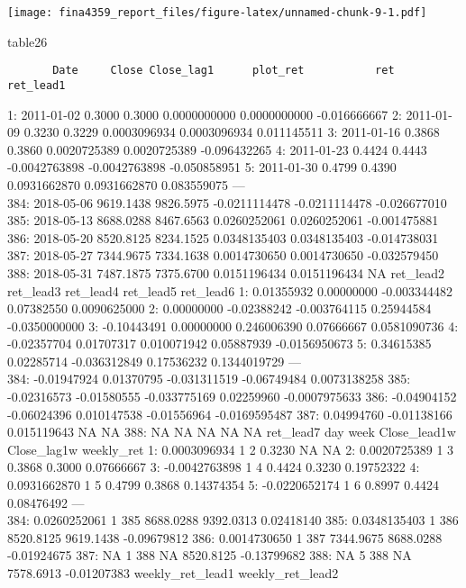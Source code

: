 \documentclass[
]{article}
\newenvironment{Shaded}{\begin{snugshade}}{\end{snugshade}}
\newcommand{\NormalTok}[1]{#1}
\begin{document}
\texttt{[image: fina4359\_report\_files/figure-latex/unnamed-chunk-9-1.pdf]}

\begin{Shaded}
\begin{Highlighting}[]
\NormalTok{table26}
\end{Highlighting}
\end{Shaded}

\begin{verbatim}
       Date     Close Close_lag1      plot_ret           ret    ret_lead1
\end{verbatim}

1: 2011-01-02 0.3000 0.3000 0.0000000000 0.0000000000 -0.016666667 2:
2011-01-09 0.3230 0.3229 0.0003096934 0.0003096934 0.011145511 3:
2011-01-16 0.3868 0.3860 0.0020725389 0.0020725389 -0.096432265 4:
2011-01-23 0.4424 0.4443 -0.0042763898 -0.0042763898 -0.050858951 5:
2011-01-30 0.4799 0.4390 0.0931662870 0.0931662870 0.083559075 ---\\
384: 2018-05-06 9619.1438 9826.5975 -0.0211114478 -0.0211114478
-0.026677010 385: 2018-05-13 8688.0288 8467.6563 0.0260252061
0.0260252061 -0.001475881 386: 2018-05-20 8520.8125 8234.1525
0.0348135403 0.0348135403 -0.014738031 387: 2018-05-27 7344.9675
7334.1638 0.0014730650 0.0014730650 -0.032579450 388: 2018-05-31
7487.1875 7375.6700 0.0151196434 0.0151196434 NA ret\_lead2 ret\_lead3
ret\_lead4 ret\_lead5 ret\_lead6 1: 0.01355932 0.00000000 -0.003344482
0.07382550 0.0090625000 2: 0.00000000 -0.02388242 -0.003764115
0.25944584 -0.0350000000 3: -0.10443491 0.00000000 0.246006390
0.07666667 0.0581090736 4: -0.02357704 0.01707317 0.010071942 0.05887939
-0.0156950673 5: 0.34615385 0.02285714 -0.036312849 0.17536232
0.1344019729 ---\\
384: -0.01947924 0.01370795 -0.031311519 -0.06749484 0.0073138258 385:
-0.02316573 -0.01580555 -0.033775169 0.02259960 -0.0007975633 386:
-0.04904152 -0.06024396 0.010147538 -0.01556964 -0.0169595487 387:
0.04994760 -0.01138166 0.015119643 NA NA 388: NA NA NA NA NA ret\_lead7
day week Close\_lead1w Close\_lag1w weekly\_ret 1: 0.0003096934 1 2
0.3230 NA NA 2: 0.0020725389 1 3 0.3868 0.3000 0.07666667 3:
-0.0042763898 1 4 0.4424 0.3230 0.19752322 4: 0.0931662870 1 5 0.4799
0.3868 0.14374354 5: -0.0220652174 1 6 0.8997 0.4424 0.08476492 ---\\
384: 0.0260252061 1 385 8688.0288 9392.0313 0.02418140 385: 0.0348135403
1 386 8520.8125 9619.1438 -0.09679812 386: 0.0014730650 1 387 7344.9675
8688.0288 -0.01924675 387: NA 1 388 NA 8520.8125 -0.13799682 388: NA 5
388 NA 7578.6913 -0.01207383 weekly\_ret\_lead1 weekly\_ret\_lead2
\end{document}
